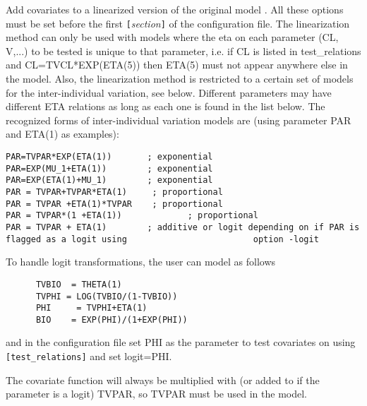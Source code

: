 Add covariates to a linearized version of the  original model \cite{Khandelwal}. All these options must be set before the first 
\verb|[|\emph{section}\verb|]|
of the configuration file. 
The linearization method can only be used with models where the eta on each parameter (CL, V,...) to be tested is unique to that parameter, i.e. if  CL is listed in test\_relations and CL=TVCL*EXP(ETA(5)) then ETA(5) must not appear anywhere else in the model. Also, the linearization method is restricted to a certain set of models for the inter-individual variation, see below. Different parameters may have different ETA relations as long as each one is found in the list below.
The recognized forms of inter-individual variation models are (using parameter PAR and ETA(1) as  examples):
\begin{verbatim}
PAR=TVPAR*EXP(ETA(1))	   	; exponential
PAR=EXP(MU_1+ETA(1))     	; exponential
PAR=EXP(ETA(1)+MU_1)    	; exponential
PAR = TVPAR+TVPAR*ETA(1)     ; proportional
PAR = TVPAR +ETA(1)*TVPAR    ; proportional
PAR = TVPAR*(1 +ETA(1))          	; proportional
PAR = TVPAR + ETA(1)   	 	; additive or logit depending on if PAR is flagged as a logit using 						option -logit
\end{verbatim}
To handle logit transformations, the user can model as follows
\begin{verbatim}
      TVBIO  = THETA(1)
      TVPHI = LOG(TVBIO/(1-TVBIO))
      PHI     = TVPHI+ETA(1)	
      BIO    = EXP(PHI)/(1+EXP(PHI))
\end{verbatim}
and in the configuration file set PHI as the parameter to test covariates on using 
\verb|[test_relations]| 
and set logit=PHI.

The covariate function will always be multiplied with (or added to if the parameter is a logit) TVPAR, so TVPAR must be used in the model.

